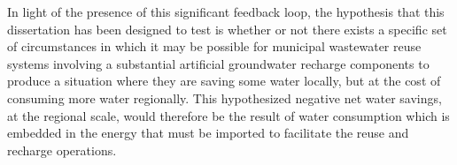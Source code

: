 In light of the presence of this significant feedback loop, the hypothesis that this dissertation has been designed to test is whether or not there exists a specific set of circumstances in which it may be possible for municipal wastewater reuse systems involving a substantial artificial groundwater recharge components to produce a situation where they are saving some water locally, but at the cost of consuming more water regionally. This hypothesized negative net water savings, at the regional scale, would therefore be the result of water consumption which is embedded in the energy that must be imported to facilitate the reuse and recharge operations.

\clearpage